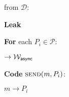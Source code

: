\begin{bbox}[title={Functionality $\mathcal{F}_\msf{RBC} (\mathcal{D}, \mathcal{P})$}]

\OnInput {} from $\mathcal{D}$:

	\begin{renumerate}

		\item {\bf Leak} 
		
		\item {\bf For} each $P_i \in \mathcal{P}$:
		\begin{renumerate}

			\item \Send {} $\rightarrow \mathcal{W}_{{\mathsf {async}}}$		

		\end{renumerate}
	\end{renumerate}

{\bf Code} $\textsc{send}(m, P_i)$:
	\begin{renumerate}

		\item \Send $m \rightarrow P_i$
	\end{renumerate}
\end{bbox}
